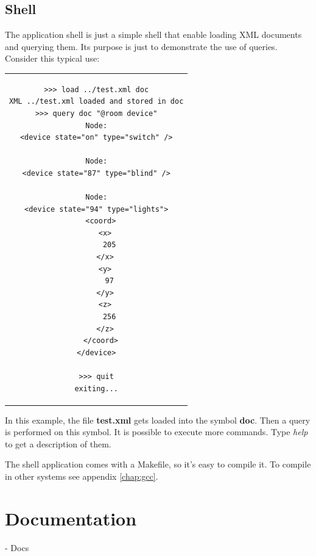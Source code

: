 \documentclass[a4paper]{report}
\begin{document}
	\section{Shell}
		The application shell is just a simple shell that enable loading XML documents and querying them. Its purpose is just to demonstrate the use of queries. Consider this typical use:

\begin{center}
\lstset{language=bash,caption=Typical usage of the shell application. The banner was intentionally removed., captionpos=b}
\begin{tabular}{c}
\begin{lstlisting}		
>>> load ../test.xml doc
XML ../test.xml loaded and stored in doc
>>> query doc "@room device"
Node:
<device state="on" type="switch" />

Node:
<device state="87" type="blind" />

Node:
<device state="94" type="lights">
  <coord>
    <x>
      205
    </x>
    <y>
      97
    </y>
    <z>
      256
    </z>
  </coord>
</device>

>>> quit
exiting...
\end{lstlisting}
\end{tabular}
\end{center}
		
		In this example, the file \textbf{test.xml} gets loaded into the symbol \textbf{doc}. Then a query is performed on this symbol. It is possible to execute more commands. Type \emph{help} to get a description of them.
		
		The shell application comes with a Makefile, so it's easy to compile it. To compile in other systems see appendix \ref{chap:gcc}.
		
\chapter{Documentation}\label{chap:doc}
	- Docs \\
	
\end{document}
